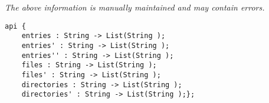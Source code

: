 \label{api:Dir\_Tree}

{\tiny \it The above information is manually maintained and may contain errors.}
\begin{verbatim}
api {
    entries : String -> List(String );
    entries' : String -> List(String );
    entries'' : String -> List(String );
    files : String -> List(String );
    files' : String -> List(String );
    directories : String -> List(String );
    directories' : String -> List(String );};
\end{verbatim}
